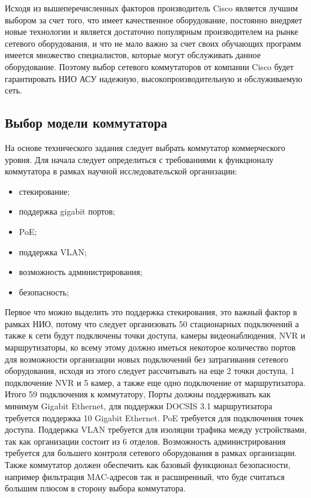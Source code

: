 Исходя из вышеперечисленных факторов производитель Cisco является лучшим выбором за счет того, что имеет качественное оборудование, постоянно внедряет
новые технологии и является достаточно популярным производителем на рынке сетевого оборудования, 
и что не мало важно за счет своих обучающих программ имеется множество специалистов, которые могут обслуживать данное оборудование. 
Поэтому выбор сетевого коммутаторов от компании Cisco будет гарантировать НИО АСУ надежную, высокопроизводительную и обслуживаемую сеть.

\subsection{Выбор модели коммутатора}

На основе технического задания следует выбрать коммутатор коммерческого уровня. 
Для начала следует определиться с требованиями к функционалу коммутатора 
в рамках научной исследовательской организации:

\begin{itemize}
    \item стекирование;
    \item поддержка gigabit портов;
    \item PoE;    
    \item поддержка VLAN;    
    \item возможность администрирования;    
    \item безопасность;
\end{itemize}

Первое что можно выделить это поддержка стекирования, это важный фактор в рамках НИО, потому что следует организовать 50 стационарных подключений
а также к сети будут подключены точки доступа, камеры видеонаблюдения, NVR и маршрутизаторы, ко всему этому должно иметься некоторое количество портов для возможности
организации новых подключений без затрагивания сетевого оборудования, исходя из этого следует рассчитывать на еще 2 точки доступа, 1 подключение NVR и 5 камер, 
а также еще одно подключение от маршрутизатора. Итого 59 подключения к коммутатору,
Порты должны поддерживать как минимум Gigabit Ethernet, для поддержки DOCSIS 3.1 маршрутизатора требуется поддержка 10 Gigabit Ethernet. PoE требуется для подключения точек доступа. 
Поддержка VLAN требуется для изоляции трафика между устройствами, так как организации состоит из 6 отделов.
Возможность администрирования требуется для большего контроля сетевого оборудования в рамках организации.
Также коммутатор должен обеспечить как базовый функционал безопасности, например фильтрация MAC-адресов так и расширенный, что буде считаться большим плюсом в сторону
выбора коммутатора.

